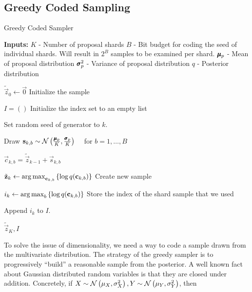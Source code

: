 \subsection{Greedy Coded Sampling}
\begin{algorithm}
  \caption{Greedy Coded Sampler}
  \label{alg:greedy_sampler}
  \begin{algorithmic}
    \State \textbf{Inputs:}
    \State $K$ - Number of proposal shards
    \State $B$ - Bit budget for coding the seed of individual shards. 
    \State Will result in $2^B$ samples to be examined per shard.
    \State $\pmb{\mu}_p$ - Mean of proposal distribution
    \State $\pmb{\sigma}_p^2$ - Variance of proposal distribution
    \State $q$ - Posterior distribution
    \Statex

    \State $\tilde{\vec{z}}_0 \gets \vec{0}$
    \Comment Initialize the sample

    \State $I = ()$
    \Comment Initialize the index set to an empty list

    \State Set random seed of generator to $k$.
    
    \State Draw $\mathbf{s}_{k, b} \sim \mathcal{N}\left( \frac{\pmb{\mu}_p}{K}, \frac{\pmb{\sigma}_p}{K} \right)
    \quad$ for $b = 1,\hdots,B$
    
    \State $\vec{c}_{k, b} = \tilde{\vec{z}}_{k - 1} + \vec{s}_{k, b}$

    \State $\tilde{\mathbf{z}}_k \gets \operatorname*{arg\,max}_{\mathbf{c}_{k, b}} \left\{ \log q(\mathbf{c}_{k, b}) \right\}$
    \Comment Create new sample

    \State $i_k \gets \operatorname*{arg\,max}_{b} \left\{ \log q(\mathbf{c}_{k, b}) \right\}$
    \Comment Store the index of the shard sample that we used

    \State Append $i_k$ to $I$.
    
    \EndFor

    \State \Return $\tilde{\vec{z}}_K, I$
    
    \EndProcedure
  \end{algorithmic}
\end{algorithm}
\par
To solve the issue of dimensionality, we need a way to code a sample
drawn from the multivariate distribution. The strategy of the greedy sampler is
to progressively ``build'' a reasonable sample from the posterior. A well
known fact about Gaussian distributed random variables is that they are
closed under addition. Concretely,
if $X \sim \mathcal{N}\left( \mu_X, \sigma^2_X \right), Y \sim \mathcal{N}\left( \mu_Y, \sigma^2_Y \right)$, then
